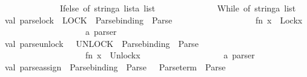 \begin{isabellebody}
\ \ \ \ \ \ \ \ \ \ \ \ {\isacharbar}{\kern0pt}\ Ifelse\ of\ {\isacharparenleft}{\kern0pt}string{\isacharasterisk}{\kern0pt}{\isacharparenleft}{\kern0pt}a\ list{\isacharparenright}{\kern0pt}{\isacharparenright}{\kern0pt}{\isacharasterisk}{\kern0pt}{\isacharparenleft}{\kern0pt}a\ list{\isacharparenright}{\kern0pt}\ \isanewline
\ \ \ \ \ \ \ \ \ \ \ \ {\isacharbar}{\kern0pt}\ While\ of\ string{\isacharasterisk}{\kern0pt}{\isacharparenleft}{\kern0pt}a\ list{\isacharparenright}{\kern0pt}\isanewline
\isanewline
val\ parse{\isacharunderscore}{\kern0pt}lock\ {\isacharequal}{\kern0pt}\ \isactrlkeyword {\isasymopen}LOCK{\isasymclose}\ {\isacharbar}{\kern0pt}{\isacharminus}{\kern0pt}{\isacharminus}{\kern0pt}\ Parse{\isachardot}{\kern0pt}binding\ {\isacharminus}{\kern0pt}{\isacharminus}{\kern0pt}{\isacharbar}{\kern0pt}\ Parse{\isachardot}{\kern0pt}{\isachardollar}{\kern0pt}{\isachardollar}{\kern0pt}{\isachardollar}{\kern0pt}\ {\isachardoublequote}{\kern0pt}{\isacharsemicolon}{\kern0pt}{\isachardoublequote}{\kern0pt}\isanewline
\ \ \ \ \ \ \ \ \ \ \ \ \ \ \ \ \ {\isachargreater}{\kern0pt}{\isachargreater}{\kern0pt}\ {\isacharparenleft}{\kern0pt}fn\ {\isacharparenleft}{\kern0pt}x{\isacharparenright}{\kern0pt}\ {\isacharequal}{\kern0pt}{\isachargreater}{\kern0pt}\ Lock{\isacharparenleft}{\kern0pt}x{\isacharparenright}{\kern0pt}{\isacharparenright}{\kern0pt}\isanewline
\ \ \ \ \ \ \ \ \ \ \ \ \ \ \ \ \ \ {\isacharcolon}{\kern0pt}\ a\ parser\isanewline
val\ parse{\isacharunderscore}{\kern0pt}unlock\ {\isacharequal}{\kern0pt}\ \ \isactrlkeyword {\isasymopen}UNLOCK{\isasymclose}\ {\isacharbar}{\kern0pt}{\isacharminus}{\kern0pt}{\isacharminus}{\kern0pt}\ Parse{\isachardot}{\kern0pt}binding\ {\isacharminus}{\kern0pt}{\isacharminus}{\kern0pt}{\isacharbar}{\kern0pt}\ Parse{\isachardot}{\kern0pt}{\isachardollar}{\kern0pt}{\isachardollar}{\kern0pt}{\isachardollar}{\kern0pt}\ {\isachardoublequote}{\kern0pt}{\isacharsemicolon}{\kern0pt}{\isachardoublequote}{\kern0pt}\isanewline
\ \ \ \ \ \ \ \ \ \ \ \ \ \ \ \ \ {\isachargreater}{\kern0pt}{\isachargreater}{\kern0pt}\ \ {\isacharparenleft}{\kern0pt}fn\ {\isacharparenleft}{\kern0pt}x{\isacharparenright}{\kern0pt}\ {\isacharequal}{\kern0pt}{\isachargreater}{\kern0pt}\ Unlock{\isacharparenleft}{\kern0pt}x{\isacharparenright}{\kern0pt}{\isacharparenright}{\kern0pt}\isanewline
\ \ \ \ \ \ \ \ \ \ \ \ \ \ \ \ \ \ {\isacharcolon}{\kern0pt}\ a\ parser\isanewline
val\ parse{\isacharunderscore}{\kern0pt}assign\ {\isacharequal}{\kern0pt}\ Parse{\isachardot}{\kern0pt}binding\ {\isacharminus}{\kern0pt}{\isacharminus}{\kern0pt}{\isacharbar}{\kern0pt}\ Parse{\isachardot}{\kern0pt}{\isachardollar}{\kern0pt}{\isachardollar}{\kern0pt}{\isachardollar}{\kern0pt}\ {\isachardoublequote}{\kern0pt}{\isacharequal}{\kern0pt}{\isachardoublequote}{\kern0pt}\ {\isacharminus}{\kern0pt}{\isacharminus}{\kern0pt}\ Parse{\isachardot}{\kern0pt}term\ {\isacharminus}{\kern0pt}{\isacharminus}{\kern0pt}{\isacharbar}{\kern0pt}\ Parse{\isachardot}{\kern0pt}{\isachardollar}{\kern0pt}{\isachardollar}{\kern0pt}{\isachardollar}{\kern0pt}\ {\isachardoublequote}{\kern0pt}{\isacharsemicolon}{\kern0pt}{\isachardoublequote}{\kern0pt}\isanewline

\end{isabellebody}
